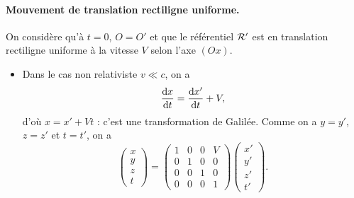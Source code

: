             \paragraph{Mouvement de translation rectiligne uniforme.} On considère qu'à $t=0$, $O=O'$ et que le référentiel $\mathcal{R}'$ est en translation rectiligne uniforme à la vitesse $V$ selon l'axe $(Ox)$. \begin{itemize}
                \item Dans le cas non relativiste $v\ll c$, on a 
                \begin{equation*}
                    \frac{\mathrm{d} x}{\mathrm{d} t}=\frac{\mathrm{d} x'}{\mathrm{d} t}+V,
                \end{equation*}
                d'où $x=x'+Vt$ : c'est une transformation de Galilée. Comme on a $y=y'$, $z=z'$ et $t=t'$, on a 
                \begin{equation*}
                    \begin{pmatrix}
                        x\\y\\z\\t
                    \end{pmatrix}=\begin{pmatrix}
                        1&0&0&V\\0&1&0&0\\0&0&1&0\\0&0&0&1
                    \end{pmatrix}\begin{pmatrix}
                        x'\\y'\\z'\\t'
                    \end{pmatrix}.
                \end{equation*}


\end{itemize}
